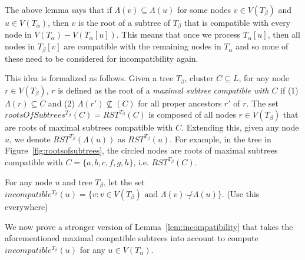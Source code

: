 \documentclass{article}
\newcommand{\compatible}{\smile}
\newcommand{\leafset}{\Lambda}
\begin{document}
    The above lemma says that if $\leafset(v) \subseteq \leafset(u)$ for some nodes $v \in V(T_\beta)$ and $u \in V(T_\alpha)$, then $v$ is the root of a subtree of $T_\beta$ that is compatible with every node in $V(T_\alpha) - V(T_\alpha[u])$. This means that once we process $T_\alpha[u]$, then all nodes in $T_\beta[v]$ are compatible with the remaining nodes in $T_\alpha$ and so none of these need to be considered for incompatibility again.

    This idea is formalized as follows. Given a tree $T_\beta$, cluster $C \subseteq L$, for any node $r \in V(T_\beta)$, $r$ is defined as the root of a \textit{maximal subtree compatible with $C$} if (1) $\leafset(r) \subseteq C$ and (2) $\leafset(r') \not\subseteq(C)$ for all proper ancestors $r'$ of $r$. The set $rootsOfSubtrees^{T_\beta}(C) = RST^{T_\beta}(C)$ is composed of all nodes $r \in V(T_\beta)$ that are roots of maximal subtrees compatible with $C$. Extending this, given any node $u$, we denote $RST^{T_\beta}(\leafset(u))$ as $RST^{T_\beta}(u)$. For example, in the tree in Figure~\ref{fig:rootsofsubtrees}, the circled nodes are roots of maximal subtrees compatible with $C = \{a, b, c, f, g, h\}$, i.e. $RST^{T_\beta}(C)$.

    For any node $u$ and tree $T_\beta$, let the set $incompatible^{T_\beta}(u) = \{v : v \in V(T_\beta) \text{ and } \leafset(v) \not\compatible \leafset(u)\}$. {\color{red} (Use this everywhere)}

    We now prove a stronger version of Lemma~\ref{lem:incompatibility} that takes the aforementioned maximal compatible subtrees into account to compute $incompatible^{T_\beta}(u)$ for any $u \in V(T_\alpha)$.
    \newline
\end{document}

